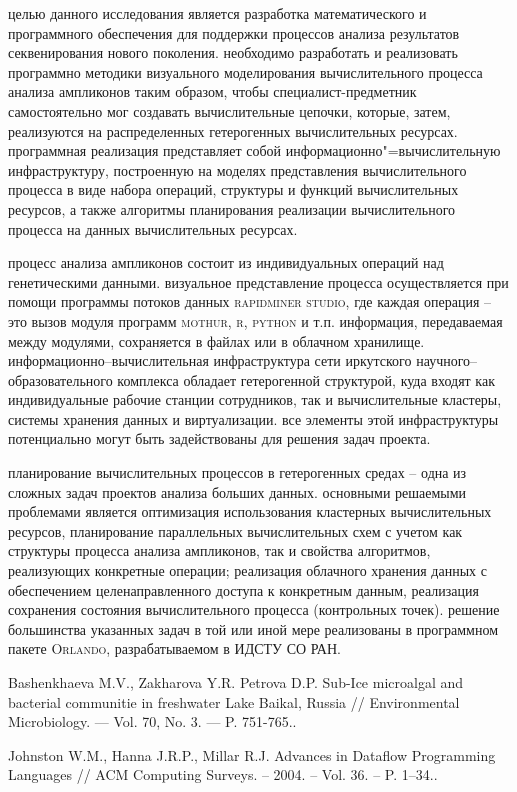\documentclass[12pt]{llncs}
\begin{document}
целью данного исследования является разработка математического и программного обеспечения для поддержки процессов анализа результатов секвенирования нового поколения.  необходимо разработать и реализовать программно методики визуального моделирования вычислительного процесса анализа ампликонов таким образом, чтобы специалист-предметник самостоятельно мог создавать вычислительные цепочки, которые, затем, реализуются на распределенных гетерогенных вычислительных ресурсах.  программная реализация представляет собой информационно"=вычислительную инфраструктуру, построенную на моделях представления вычислительного процесса в виде набора операций, структуры и функций вычислительных ресурсов, а также алгоритмы планирования реализации вычислительного процесса на данных вычислительных ресурсах.

процесс анализа ампликонов состоит из индивидуальных операций над генетическими данными.  визуальное представление процесса осуществляется при помощи программы потоков данных \cite{dataflow} \textsc{rapidminer studio}, где каждая операция -- это вызов модуля программ \textsc{mothur}, \textsc{r}, \textsc{python} и т.п.  информация, передаваемая между модулями, сохраняется в файлах или в облачном хранилище.  информационно--вычислительная инфраструктура сети иркутского научного--образовательного комплекса обладает гетерогенной структурой, куда входят как индивидуальные рабочие станции сотрудников, так и вычислительные кластеры, системы хранения данных и виртуализации.  все элементы этой инфраструктуры потенциально могут быть задействованы для решения задач проекта.

планирование вычислительных процессов в гетерогенных средах -- одна из сложных задач проектов анализа больших данных.  основными решаемыми проблемами является оптимизация использования кластерных вычислительных ресурсов, планирование параллельных вычислительных схем с учетом как структуры процесса анализа ампликонов, так и свойства алгоритмов, реализующих конкретные операции; реализация облачного хранения данных с обеспечением целенаправленного доступа к конкретным данным, реализация сохранения состояния вычислительного процесса (контрольных точек).  решение большинства указанных задач в той или иной мере реализованы в программном пакете \textsc{Orlando}, разрабатываемом в ИДСТУ СО РАН.


\begin{thebibliography}{9}
 Bashenkhaeva M.V., Zakharova Y.R. Petrova D.P. Sub-Ice microalgal and bacterial communitie in freshwater Lake Baikal, Russia // Environmental Microbiology. — Vol. 70, No. 3. — P. 751-765..

 Johnston W.M., Hanna J.R.P., Millar R.J. Advances in Dataflow Programming Languages // ACM Computing Surveys. – 2004. – Vol. 36. – P. 1–34..


\end{thebibliography}
\end{document}
